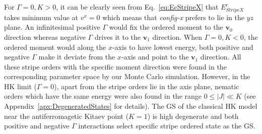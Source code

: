 \documentclass[aps,prb,reprint,amsfonts,amsmath,amssymb,showpacs,groupedaddress,superscriptaddress]{revtex4-1}
\begin{document}
For $\Gamma=0, K>0$, it can be clearly seen from Eq.~\eqref{eq:EcStripeX} that $E_{StripeX}^{c}$ takes minimum value at $v^x = 0$ which means that \emph{config-x} prefers to lie in the $yz$ plane. An infinitesimal positive $\Gamma$ would fix the ordered moment to the $\bm{v}_0$ direction whereas negative $\Gamma$ drives it to the $\bm{v}_1$ direction. When $\Gamma=0, K<0$, the ordered moment would along the $x$-axis to have lowest energy, both positive and negative $\Gamma$ make it deviate from the $x$-axis and point to the $\bm{v}_1$ direction. All these stripe orders with the specific moment direction were found in the corresponding parameter space by our Monte Carlo simulation. However, in the HK limit ($\Gamma=0$), apart from the stripe orders lie in the axis plane, nematic orders which have the same energy were also found in the range $0 \leq |J| \ll K$ (see Appendix~\ref{apx:DegeneratedStates} for details). The GS of the classical HK model near the antiferromagetic Kitaev point ($K=1$) is high degenerate and both positive and negative $\Gamma$ interactions select specific stripe ordered state as the GS.
\end{document}
